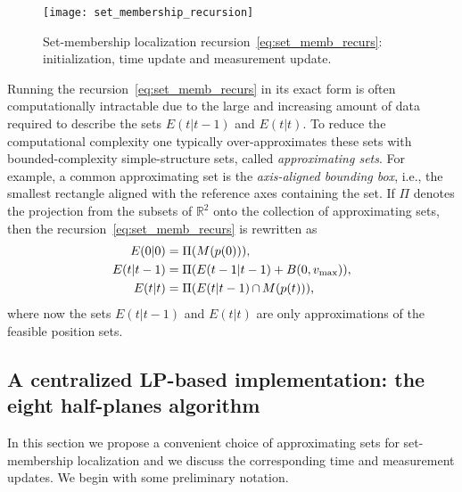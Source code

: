 \documentclass[onecolumn,journal,letterpaper]{IEEEtran}
\newcommand{\real}{{\mathbb{R}}}
\newcommand{\subscr}[2]{{#1}_{\textup{#2}}}
\newcommand{\intersection}{\ensuremath{\operatorname{\cap}}}
\newcommand{\cball}[2]{B(#2,#1)}
\begin{document}
\begin{figure}[h]
\begin{center}
  \texttt{[image: set\_membership\_recursion]}\caption{Set-membership localization
    recursion~\eqref{eq:set_memb_recurs}: initialization, time update and
    measurement update.}
  \label{fig:set_membership_recursion}
\end{center}
\end{figure}


Running the recursion~\eqref{eq:set_memb_recurs} in its exact form is often
computationally intractable due to the large and increasing amount of data
required to describe the sets $E(t|t-1)$ and $E(t|t)$. To reduce the
computational complexity one typically over-approximates these sets with
bounded-complexity simple-structure sets, called \emph{approximating sets}.
For example, a common approximating set is the \emph{axis-aligned bounding
  box}, i.e., the smallest rectangle aligned with the reference axes
containing the set.  If $\Pi$ denotes the projection from the subsets of
$\real^2$ onto the collection of approximating sets, then the
recursion~\eqref{eq:set_memb_recurs} is rewritten as
\begin{subequations}
  \label{eq:set_memb_recurs_approx}
  \begin{align}
    E(0|0)    &= \Pi(M(p(0))),
    \label{eq:set_memb_recurs_approx-initialization}
    \\
    E(t|t-1)  &= \Pi( E(t-1|t-1) + \cball{\subscr{v}{max}}{0} ),
    \label{eq:set_memb_recurs_approx-time-update}
    \\
    E(t|t) &= \Pi( E(t|t-1) \intersection M(p(t)) ),
    \label{eq:set_memb_recurs_approx-measurement-update}
  \end{align}
\end{subequations}
where now the sets $E(t|t-1)$ and $E(t|t)$ are only approximations of the
feasible position sets.


\subsection{A centralized LP-based implementation: the eight half-planes
  algorithm}
In this section we propose a convenient choice of approximating sets for
set-membership localization and we discuss the corresponding time and
measurement updates. We begin with some preliminary notation.
\end{document}
